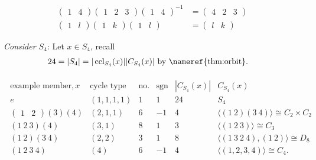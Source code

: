 \begin{example}
    \begin{align*}
        \begin{pmatrix}1 & 4\end{pmatrix} \begin{pmatrix}1 & 2 & 3\end{pmatrix} \begin{pmatrix}1 & 4\end{pmatrix}^{-1} &= \begin{pmatrix}4 & 2 & 3\end{pmatrix} \\
        \begin{pmatrix}1 & l\end{pmatrix} \begin{pmatrix}1 & k\end{pmatrix} \begin{pmatrix}1 & l\end{pmatrix} &= \begin{pmatrix}l & k\end{pmatrix}
    \end{align*} 
\end{example} 

\emph{Consider $S_4$}: Let $x \in S_4$, recall 
\begin{align*}
    24 &= |S_4| = |\operatorname{ccl}_{S_4} (x)| |C_{S_4}(x)| \text{ by \nameref{thm:orbit}}.
\end{align*} 

\begin{align*}
    \begin{array}{cccccc}
        \text{example member}, x & \text{cycle type} & \text{no. of} & \operatorname{sgn} & |C_{S_4}(x)| & C_{S_4}(x) \\
        e & (1, 1, 1, 1) & 1 & 1 & 24 & S_4 \\
        \begin{pmatrix}1 & 2\end{pmatrix} (3)(4) & (2, 1, 1) & 6 & -1 & 4 & \langle (1\ 2) (3\ 4) \rangle \cong C_2 \times C_2 \\
        (1\ 2\ 3)(4) & (3, 1) & 8 & 1 & 3 & \langle (1\ 2\ 3) \rangle \cong C_3 \\
        (1\ 2) (3\ 4) & (2, 2) & 3 & 1 & 8 & \langle (1\ 3\ 2\ 4), (1\ 2) \rangle \cong D_8 \\
        (1\ 2\ 3\ 4) & (4) & 6 & -1 & 4 & \langle (1, 2, 3, 4) \rangle \cong C_4.
    \end{array}  
\end{align*} 

